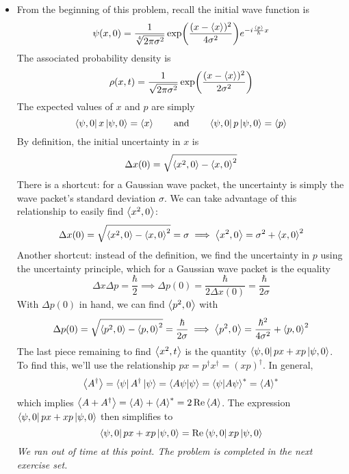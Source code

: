\documentclass[11pt, a4paper]{article}
\newcommand{\eqtext}[1]{\qquad \text{#1} \qquad}
\begin{document}
\begin{itemize}
	\item From the beginning of this problem, recall the initial wave function is
	\begin{equation*}
		\psi(x, 0) = \frac{1}{\sqrt[4]{2\pi \sigma^{2}}} \exp(\frac{(x - \ev{x})^{2}}{4 \sigma^{2}})e^{-i\frac{\ev{p}}{\hbar}x}
	\end{equation*}
	The associated probability density is 
	\begin{equation*}
		\rho(x, t) = \frac{1}{\sqrt{2\pi \sigma^{2}}} \exp(\frac{(x - \ev{x})^{2}}{2 \sigma^{2}})
	\end{equation*}
	The expected values of $ x $ and $ p $ are simply
	\begin{equation*}
		\bra{\psi, 0} x \ket{\psi, 0} = \ev{x} \eqtext{and} \bra{\psi, 0} p \ket{\psi, 0} = \ev{p}
	\end{equation*}
	By definition, the initial uncertainty in $ x $ is
	\begin{equation*}
		\Delta x(0) = \sqrt{\ev{x^{2}, 0} - \ev{x, 0}^{2}}
	\end{equation*}
	There is a shortcut: for a Gaussian wave packet, the uncertainty is simply the wave packet's standard deviation $ \sigma $. We can take advantage of this relationship to easily find $ \ev{x^{2}, 0} $:
	\begin{equation*}
		\Delta x(0) = \sqrt{\ev{x^{2}, 0} - \ev{x, 0}^{2}} = \sigma \implies \ev{x^{2}, 0} = \sigma^{2} + \ev{x, 0}^{2}
	\end{equation*}
	Another shortcut: instead of the definition, we find the uncertainty in $ p $ using the uncertainty principle, which for a Gaussian wave packet is the equality
	\begin{equation*}
		\Delta x \Delta p = \frac{\hbar}{2} \implies \Delta p(0) = \frac{\hbar}{2\Delta x(0)} = \frac{\hbar}{2\sigma}
	\end{equation*}
	With $ \Delta p(0) $ in hand, we can find $ \ev{p^{2}, 0} $ with
	\begin{equation*}
		\Delta p(0) = \sqrt{\ev{p^{2}, 0} - \ev{p, 0}^{2}} = \frac{\hbar}{2\sigma} \implies \ev{p^{2}, 0} = \frac{\hbar^{2}}{4\sigma^{2}} + \ev{p, 0}^{2}
	\end{equation*}
	The last piece remaining to find $ \ev{x^{2}, t} $ is the quantity $ \bra{\psi, 0} px + xp \ket{\psi, 0}  $. To find this, we'll use the relationship $ px = p^{\dagger}x^{\dagger} = (xp)^{\dagger} $. In general,
	\begin{equation*}
		\ev{A^{\dagger}} = \bra{\psi}A^{\dagger}\ket{\psi} = \braket{A\psi}{\psi} = \braket{\psi}{A\psi}^{*} = \ev{A}^{*}
	\end{equation*}
	which implies $ \ev{A + A^{\dagger}} = \ev{A} + \ev{A}^{*} = 2 \Re \ev{A} $. The expression $  \bra{\psi, 0} px + xp \ket{\psi, 0}  $ then simplifies to
	\begin{equation*}
		 \bra{\psi, 0} px + xp \ket{\psi, 0}  = \Re \bra{\psi, 0}xp \ket{\psi, 0} 
	\end{equation*}
	\textit{We ran out of time at this point. The problem is completed in the next exercise set.}
	
\end{itemize}
\end{document}
